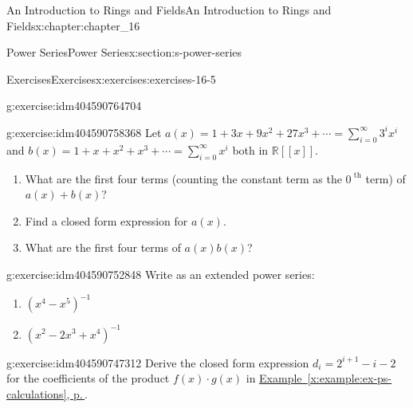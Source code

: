 \documentclass[twoside,10pt,]{book}
\newcommand{\xreffont}{\relax}
\numberwithin{equation}{section}
\begin{document}
\begin{chapterptx}{An Introduction to Rings and Fields}{}{An Introduction to Rings and Fields}{}{}{x:chapter:chapter_16}
\begin{sectionptx}{Power Series}{}{Power Series}{}{}{x:section:s-power-series}
\begin{exercises-subsection}{Exercises}{}{Exercises}{}{}{x:exercises:exercises-16-5}
\begin{divisionexercise}{5}{}{}{g:exercise:idm404590764704}
%
\end{divisionexercise}%
\begin{divisionexercise}{6}{}{}{g:exercise:idm404590758368}%
Let \(a(x) = 1 + 3x + 9x^2 + 27x^3 + \cdots =\sum_{i=0}^{\infty } 3^i x^i\) and \(b(x) = 1 + x + x^2+ x^3+\cdots =\sum_{i=0}^{\infty }  x^i\) both in \(\mathbb{R}[[x]]\).%
\begin{enumerate}[label=(\alph*)]
\item{}What are the first four terms (counting the constant term as the \(0^{\textrm{ th}}\) term) of \(a(x) + b(x)\)?%
\item{}Find a closed form expression for \(a(x)\).%
\item{}What are the first four terms of \(a(x) b(x)\)?%
\end{enumerate}
%
\end{divisionexercise}%
\begin{divisionexercise}{7}{}{}{g:exercise:idm404590752848}%
Write as an extended power series:%
\begin{enumerate}[label=(\alph*)]
\item{}\(\left(x^4-x^5\right)^{-1}\)%
\item{}\(\left(x^2-2x^3+x^4\right)^{-1}\)%
\end{enumerate}
%
\end{divisionexercise}%
\begin{divisionexercise}{8}{}{}{g:exercise:idm404590747312}%
Derive the closed form expression \(d_i = 2^{i+1}-i -2 \) for the coefficients of the product \(f(x)\cdot g(x)\) in \hyperref[x:example:ex-ps-calculations]{Example~{\xreffont\ref{x:example:ex-ps-calculations}}, p.\,\pageref{x:example:ex-ps-calculations}}.%
\end{divisionexercise}%
\end{exercises-subsection}
\end{sectionptx}
\end{chapterptx}
%
%
%
%
\typeout{************************************************}
\typeout{************************************************}
%
%
\appendix
%
\end{document}
